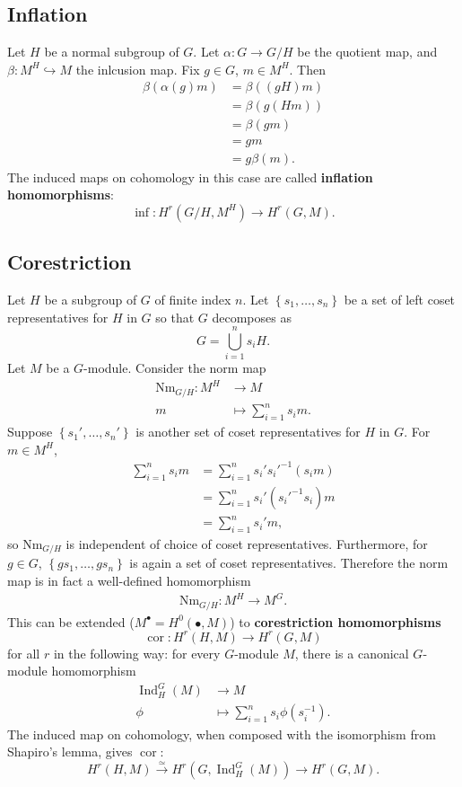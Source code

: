 \documentclass[class=article, crop=false]{standalone}
\newcommand{\Ind}{\operatorname{Ind}}
\newcommand{\cor}{\operatorname{cor}}
\newcommand{\Nm}{\mathrm{Nm}}
\theoremstyle{definition}
\begin{document}
\subsection{Inflation}
Let $H$ be a normal subgroup of $G$. Let $\alpha:G\to G/H$ be the quotient map, and $\beta:M^{H}\hookrightarrow M$ the inlcusion map. Fix $g\in G$, $m\in M^{H}$. Then 
\begin{align*}
	\beta(\alpha(g)m)&=\beta((gH)m)\\
			 &=\beta(g(Hm))\\
			 &=\beta(gm)\\
			 &=gm\\
			 &=g\beta(m)
.\end{align*}
The induced maps on cohomology in this case are called \textbf{inflation homomorphisms}:
\[
	\inf:H^{r}(G/H,M^{H})\to H^{r}(G,M)
.\] 
\subsection{Corestriction}
Let $H$ be a subgroup of $G$ of finite index $n$. Let $\left\lbrace s_1,\dots, s_n\right\rbrace$ be a set of left coset representatives for $H$ in $G$ so that $G$ decomposes as
\[
	G=\bigcup\limits_{i=1}^{n}s_iH
.\] 
Let $M$ be a $G$-module. Consider the norm map  
\begin{align*}
	\Nm_{G/H}:M^{H}&\to M\\
	m&\mapsto\sum\limits_{i=1}^{n}s_im
.\end{align*}
Suppose $\left\lbrace s_1',\dots, s_n'\right\rbrace$ is another set of coset representatives for $H$ in $G$. For $m\in M^{H}$,
\begin{align*}
	\sum\limits_{i=1}^{n}s_im&=\sum\limits_{i=1}^{n}s_i's_i'^{-1}(s_im)\\
				 &=\sum\limits_{i=1}^{n}s_i'(s_i'^{-1}s_i)m\\
				 &=\sum\limits_{i=1}^{n}s_i'm
,\end{align*}
so $\Nm_{G/H}$ is independent of choice of coset representatives. Furthermore, for $g\in G$, $\left\lbrace gs_1,\dots, gs_n\right\rbrace$ is again a set of coset representatives. Therefore the norm map is in fact a well-defined homomorphism
\begin{align*}
	\Nm_{G/H}:M^{H}\to M^{G}
.\end{align*}
This can be extended ($M^{\bullet}=H^{0}(\bullet,M)$) to \textbf{corestriction homomorphisms}
\[
	\cor:H^{r}(H,M)\to H^{r}(G,M)
\] 
for all $r$ in the following way: for every $G$-module $M$, there is a canonical $G$-module homomorphism
\begin{align*}
	\Ind^{G}_H(M)&\to M\\
	\phi&\mapsto\sum\limits_{i=1}^{n}s_i\phi(s_i^{-1})
.\end{align*}
The induced map on cohomology, when composed with the isomorphism from Shapiro's lemma, gives $\cor$:
\[
	H^{r}(H,M)\xrightarrow{\simeq}H^{r}(G,\Ind^{G}_H(M))\to H^{r}(G,M)
.\] 
\end{document}
